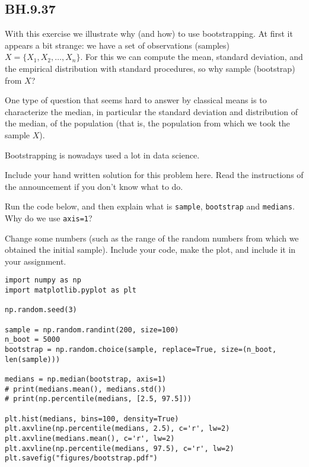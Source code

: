 
\subsection{BH.9.37}




With this exercise we illustrate why (and how) to use bootstrapping. At first it appears a bit strange: we have a set of observations (samples) $X=\{X_{1}, X_2, \ldots, X_{n}\}$. For this we can compute the mean, standard deviation, and the empirical distribution with standard procedures, so why sample (bootstrap) from $X$?

One type of question that seems hard to answer by classical means is to characterize the median, in particular the standard deviation and distribution of the median, of the population (that is, the population from which we took the sample $X$).

Bootstrapping is nowadays used a lot in data science.

\begin{exercise}
Include your hand written solution for this problem here. Read the instructions of the announcement if you don't know what to do.
\end{exercise}

\begin{exercise}
Run the code below, and then explain what is \texttt{sample}, \texttt{bootstrap} and \texttt{medians}. Why do we use \texttt{axis=1}?
\end{exercise}

\begin{exercise}
Change some numbers (such as the range of the random numbers from which we obtained the initial sample). Include your code,  make the plot, and include it in your assignment.
\end{exercise}

\begin{verbatim}
import numpy as np
import matplotlib.pyplot as plt

np.random.seed(3)

sample = np.random.randint(200, size=100)
n_boot = 5000
bootstrap = np.random.choice(sample, replace=True, size=(n_boot, len(sample)))

medians = np.median(bootstrap, axis=1)
# print(medians.mean(), medians.std())
# print(np.percentile(medians, [2.5, 97.5]))

plt.hist(medians, bins=100, density=True)
plt.axvline(np.percentile(medians, 2.5), c='r', lw=2)
plt.axvline(medians.mean(), c='r', lw=2)
plt.axvline(np.percentile(medians, 97.5), c='r', lw=2)
plt.savefig("figures/bootstrap.pdf")
\end{verbatim}

